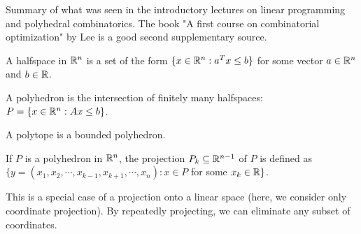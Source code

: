 \documentclass[12pt]{article}
\begin{document}

Summary of what was seen in the introductory lectures on
linear programming and polyhedral combinatorics. The book "A first course on combinatorial optimization" by Lee is a good second supplementary source.

\begin{definition} A halfspace in ${\mathbb R}^n$ is a set of the form $\{x\in
  {\mathbb R}^n: a^Tx\leq b\}$ for some vector $a\in {\mathbb R}^n$ and $b\in {\mathbb R}$.
\end{definition}

\begin{definition} A polyhedron is the intersection of finitely many
  halfspaces: $P=\{x\in {\mathbb R}^n: Ax \leq b\}$. 
\end{definition}

\begin{definition} \label{def1} A polytope is a bounded polyhedron. 
\end{definition}

\begin{definition}
If $P$ is a polyhedron in ${\mathbb R}^n$, the projection $P_k\subseteq
{\mathbb R}^{n-1}$ of $P$ is defined as \\
$\{y=(x_1,x_2,\cdots,x_{k-1},x_{k+1},\cdots, x_n): x\in P$ for some
$x_k\in{\mathbb R}\}$.
\end{definition}
This is a special case of a projection onto a linear space (here, we
consider only coordinate projection). By repeatedly projecting, we can
eliminate any subset of coordinates.  
\end{document}
